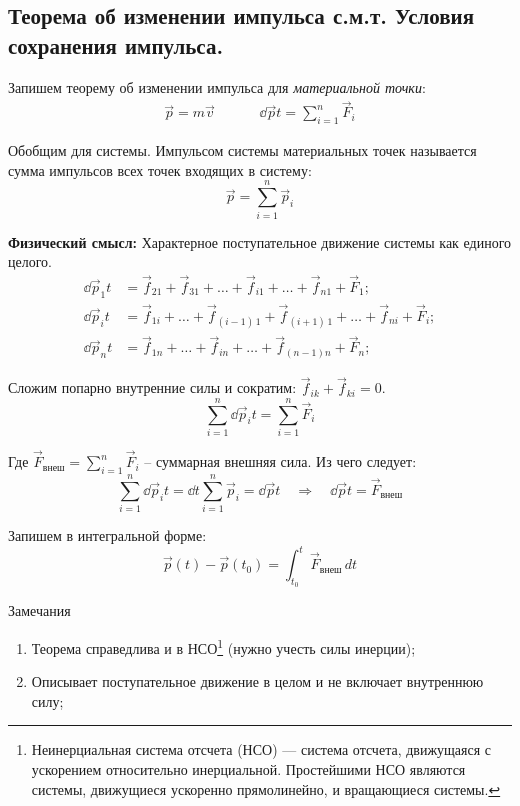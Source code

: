 \subsection{\textbf{Теорема об изменении импульса с.м.т.} Условия сохранения импульса.}

Запишем теорему об изменении импульса для \textit{материальной точки}:
\[\begin{aligned}
	\vec{p} = m\vec{v} &&&& \dd{\vec{p}}{t} = \sum_{i=1}^{n} \vec{F}_i
\end{aligned}\]

Обобщим для системы. Импульсом системы материальных точек называется сумма импульсов всех точек входящих в систему:
\[\vec{p} = \sum_{i=1}^{n} \vec{p}_i\]

\textbf{Физический смысл:} Характерное поступательное движение системы как единого целого.
\begin{align*}
	\dd{\vec{p}_1}{t} &= \vec{f}_{21} + \vec{f}_{31} + \dots + \vec{f}_{i1} + \dots + \vec{f}_{n1} + \vec{F}_1; \\
	\dd{\vec{p}_i}{t} &= \vec{f}_{1i} + \dots + \vec{f}_{(i-1) \, 1} +\vec{f}_{(i+1) \, 1} + \dots + \vec{f}_{ni} + \vec{F}_i; \\
	\dd{\vec{p}_n}{t} &= \vec{f}_{1n} + \dots + \vec{f}_{in} + \dots + \vec{f}_{(n-1)n} + \vec{F}_n;
\end{align*}

Сложим попарно внутренние силы и сократим: \(\vec{f}_{ik} + \vec{f}_{ki} = 0\).
\[\sum_{i=1}^{n} \dd{\vec{p}_i}{t} = \sum_{i=1}^{n} \vec{F}_i\]

Где $\vec{F}_{\text{внеш}} = \sum_{i=1}^{n} \vec{F}_i$ -- суммарная внешняя сила. Из чего следует:
\[\sum_{i=1}^{n} \dd{\vec{p}_i}{t} = \dd{}{t} \sum_{i=1}^{n} \vec{p}_i = \dd{\vec{p}}{t} \quad\Rightarrow\quad \boxed{\dd{\vec{p}}{t} = \vec{F}_\text{внеш}}\]

Запишем в интегральной форме:
\[\boxed{\vec{p}(t) - \vec{p}(t_0) = \int_{t_0}^{t} \vec{F}_{\text{внеш}} \, dt}\]

\begin{tbox}{Замечания}
	\begin{enumerate}
		\item Теорема справедлива и в НСО\footnote{Неинерциальная система отсчета (НСО) — система отсчета, движущаяся с ускорением относительно инерциальной. Простейшими НСО являются системы, движущиеся ускоренно прямолинейно, и вращающиеся системы.} (нужно учесть силы инерции);
		\item Описывает поступательное движение в целом и не включает внутреннюю силу;
	\end{enumerate}
\end{tbox}

